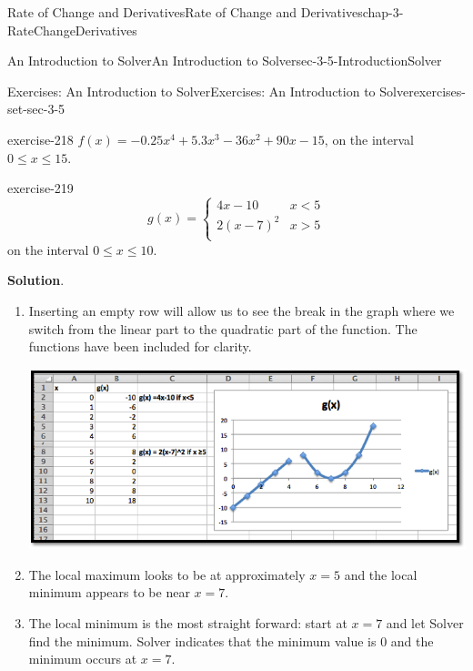 \documentclass[oneside,10pt,]{book}
\numberwithin{equation}{section}
\newcommand{\lt}{<}
\newcommand{\gt}{>}
\begin{document}
\begin{chapterptx}{Rate of Change and Derivatives}{}{Rate of Change and Derivatives}{}{}{chap-3-RateChangeDerivatives}
\begin{sectionptx}{An Introduction to Solver}{}{An Introduction to Solver}{}{}{sec-3-5-IntroductionSolver}
\begin{exercises-subsection-numberless}{Exercises: An Introduction to Solver}{}{Exercises: An Introduction to Solver}{}{}{exercises-set-sec-3-5}
\begin{enumerate}[label=(\alph*)]
\end{enumerate}
\begin{divisionexercise}{8}{}{}{exercise-218}%
\hypertarget{p-1404}{}%
\(f(x)=-0.25x^4+5.3x^3-36x^2+90x-15\), on the interval \(0\le x\le 15\).%
\end{divisionexercise}%
\begin{divisionexercise}{9}{}{}{exercise-219}%
\hypertarget{p-1405}{}%
%
\begin{equation*}
g(x)=\begin{cases}
4x-10& x\lt 5\\
2(x-7)^2&x \gt 5\\
\end{cases}
\end{equation*}
on the interval \(0\le x\le 10\).%
\par\smallskip%
\noindent\textbf{Solution}.\hypertarget{solution-109}{}\quad%
\leavevmode%
\begin{enumerate}[label=(\alph*)]
\item\hypertarget{li-444}{}\hypertarget{p-1406}{}%
Inserting an empty row will allow us to see the break in the graph where we switch from the linear part to the quadratic part of the function. The functions have been included for clarity.%
\begin{sidebyside}{1}{0.05}{0.05}{0}%
\begin{sbspanel}{0.9}%
\includegraphics[width=1\linewidth]{images/sec3-5-sol9a.png}
\end{sbspanel}%
\end{sidebyside}%
\item\hypertarget{li-445}{}\hypertarget{p-1407}{}%
The local maximum looks to be at approximately \(x = 5\) and the local minimum appears to be near \(x = 7\).%
\item\hypertarget{li-446}{}\hypertarget{p-1408}{}%
The local minimum is the most straight forward: start at \(x = 7\) and let Solver find the minimum. Solver indicates that the minimum value is 0 and the minimum occurs at \(x = 7\).%

\end{enumerate}
\end{divisionexercise}
\end{exercises-subsection-numberless}
\end{sectionptx}
\end{chapterptx}
\end{document}
